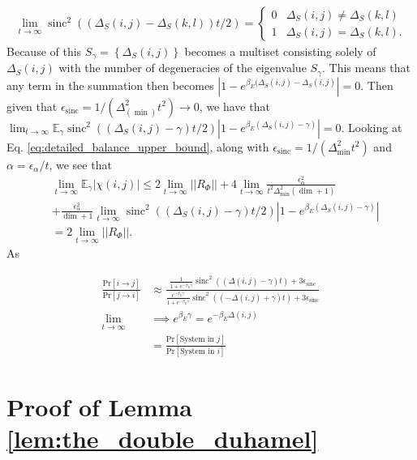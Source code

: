 \documentclass{article}
\newcommand{\abs}[1]{\left| #1 \right|}
\newcommand{\norm}[1]{\left| \left| #1 \right| \right|}
\newcommand{\set}[1]{\left\{ #1 \right\}}
\newcommand{\prob}[1]{\text{Pr}\left[ #1 \right]}
\DeclareMathOperator{\sinc}{sinc}
\begin{document}
\begin{align}
    \lim_{t \to \infty} \sinc^2((\Delta_S(i,j) - \Delta_S(k,l)) t/2) = \begin{cases}
        0 & \Delta_S(i,j) \neq \Delta_S(k,l) \\
        1 & \Delta_S(i,j) = \Delta_S(k,l).
    \end{cases}
\end{align}
Because of this $S_{\gamma} = \set{\Delta_S(i,j)}$ becomes a multiset consisting solely of $\Delta_S(i,j)$ with the number of degeneracies of the eigenvalue $S_{\gamma}$. This means that any term in the summation then becomes $\abs{1 - e^{\beta_E(\Delta_S(i,j) - \Delta_S(i,j)}} = 0$. Then given that $\epsilon_{\sinc} = 1/(\Delta_(\min)^2 t^2) \to 0$, we have that $\lim_{t \to \infty} \mathbb{E}_{\gamma} \sinc^2((\Delta_S(i,j) - \gamma)t/2) \abs{1 - e^{\beta_E(\Delta_S(i,j) - \gamma)}} = 0$. Looking at Eq. \eqref{eq:detailed_balance_upper_bound}, along with $\epsilon_{\sinc} = 1/(\Delta_{\min}^2 t^2)$ and $\alpha = \epsilon_{\alpha} / t$, we see that 
\begin{align}
    &\lim_{t \to \infty} \mathbb{E}_{\gamma} \abs{\chi(i,j)} \leq 2 \lim_{t \to \infty} \norm{R_{\Phi}} + 4 \lim_{t \to \infty} \frac{\epsilon_{\alpha}^2}{t^2 \Delta_{\min}^2 (\dim + 1)} \nonumber \\
    &+ \frac{\epsilon_{\alpha}^2}{\dim + 1} \lim_{t \to \infty} \sinc^2((\Delta_S(i,j) - \gamma)t/2) \abs{1 - e^{\beta_E(\Delta_S(i,j) - \gamma)}} \\
    &= 2 \lim_{t \to \infty} \norm{R_{\Phi}}.
\end{align}
As 



\begin{align}
    \frac{\prob{i \to j}}{\prob{j \to i}} &\approx \frac{\frac{1}{1 + e^{-\beta_E \gamma}}\sinc^2 ((\Delta(i,j) - \gamma)t)+ 3 \epsilon_{\sinc}}{\frac{e^{-\beta_E \gamma}}{1 + e^{-\beta_E \gamma}} \sinc^2((-\Delta(i,j) + \gamma)t) + 3 \epsilon_{\sinc}}  \nonumber \\
    \lim_{t \to \infty} &\implies e^{\beta_E \gamma} = e^{-\beta_E \Delta(i,j)} \nonumber \\
    &= \frac{\prob{\text{System in } j}}{ \prob{\text{System in } i}} \nonumber
\end{align}

\section{Proof of Lemma \ref{lem:the_double_duhamel}}
\end{document}
